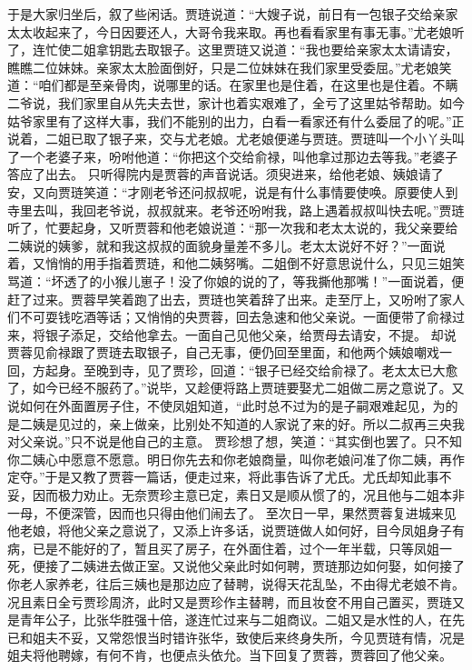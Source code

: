 \documentclass[12pt,oneside]{book}
\begin{document}
于是大家归坐后，叙了些闲话。贾琏说道：“大嫂子说，前日有一包银子交给亲家太太收起来了，今日因要还人，大哥令我来取。再也看看家里有事无事。”尤老娘听了，连忙使二姐拿钥匙去取银子。这里贾琏又说道：“我也要给亲家太太请请安，瞧瞧二位妹妹。亲家太太脸面倒好，只是二位妹妹在我们家里受委屈。”尤老娘笑道：“咱们都是至亲骨肉，说哪里的话。在家里也是住着，在这里也是住着。不瞒二爷说，我们家里自从先夫去世，家计也着实艰难了，全亏了这里姑爷帮助。如今姑爷家里有了这样大事，我们不能别的出力，白看一看家还有什么委屈了的呢。”正说着，二姐已取了银子来，交与尤老娘。尤老娘便递与贾琏。贾琏叫一个小丫头叫了一个老婆子来，吩咐他道：“你把这个交给俞禄，叫他拿过那边去等我。”老婆子答应了出去。
只听得院内是贾蓉的声音说话。须臾进来，给他老娘、姨娘请了安，又向贾琏笑道：“才刚老爷还问叔叔呢，说是有什么事情要使唤。原要使人到寺里去叫，我回老爷说，叔叔就来。老爷还吩咐我，路上遇着叔叔叫快去呢。”贾琏听了，忙要起身，又听贾蓉和他老娘说道：“那一次我和老太太说的，我父亲要给二姨说的姨爹，就和我这叔叔的面貌身量差不多儿。老太太说好不好？”一面说着，又悄悄的用手指着贾琏，和他二姨努嘴。二姐倒不好意思说什么，只见三姐笑骂道：“坏透了的小猴儿崽子！没了你娘的说的了，等我撕他那嘴！”一面说着，便赶了过来。贾蓉早笑着跑了出去，贾琏也笑着辞了出来。走至厅上，又吩咐了家人们不可耍钱吃酒等话；又悄悄的央贾蓉，回去急速和他父亲说。一面便带了俞禄过来，将银子添足，交给他拿去。一面自己见他父亲，给贾母去请安，不提。
却说贾蓉见俞禄跟了贾琏去取银子，自己无事，便仍回至里面，和他两个姨娘嘲戏一回，方起身。至晚到寺，见了贾珍，回道：“银子已经交给俞禄了。老太太已大愈了，如今已经不服药了。”说毕，又趁便将路上贾琏要娶尤二姐做二房之意说了。又说如何在外面置房子住，不使凤姐知道，“此时总不过为的是子嗣艰难起见，为的是二姨是见过的，亲上做亲，比别处不知道的人家说了来的好。所以二叔再三央我对父亲说。”只不说是他自己的主意。
贾珍想了想，笑道：“其实倒也罢了。只不知你二姨心中愿意不愿意。明日你先去和你老娘商量，叫你老娘问准了你二姨，再作定夺。”于是又教了贾蓉一篇话，便走过来，将此事告诉了尤氏。尤氏却知此事不妥，因而极力劝止。无奈贾珍主意已定，素日又是顺从惯了的，况且他与二姐本非一母，不便深管，因而也只得由他们闹去了。
至次日一早，果然贾蓉复进城来见他老娘，将他父亲之意说了，又添上许多话，说贾琏做人如何好，目今凤姐身子有病，已是不能好的了，暂且买了房子，在外面住着，过个一年半载，只等凤姐一死，便接了二姨进去做正室。又说他父亲此时如何聘，贾琏那边如何娶，如何接了你老人家养老，往后三姨也是那边应了替聘，说得天花乱坠，不由得尤老娘不肯。况且素日全亏贾珍周济，此时又是贾珍作主替聘，而且妆奁不用自己置买，贾琏又是青年公子，比张华胜强十倍，遂连忙过来与二姐商议。二姐又是水性的人，在先已和姐夫不妥，又常怨恨当时错许张华，致使后来终身失所，今见贾琏有情，况是姐夫将他聘嫁，有何不肯，也便点头依允。当下回复了贾蓉，贾蓉回了他父亲。
\end{document}
